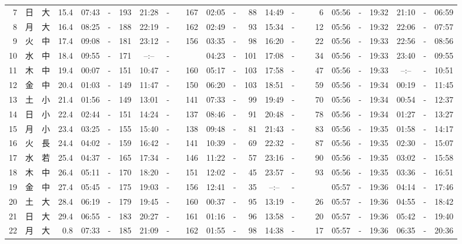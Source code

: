 \documentclass[12pt,a4j]{jsarticle}
\begin{document}
\begin{table}[htbp]
\begin{center}
{\begin{tabular}{|rc|cr|ccrccr|ccrccr|ccc|ccc|}
 7 & 日 & 大 & 15.4 &  07:43 &-& 193 &  21:28 &-& 167 &  02:05 &-&  88 &  14:49 &-&   6 & 05:56 & -& 19:32 & 21:10 & -& 06:59 \\
 8 & 月 & 大 & 16.4 &  08:25 &-& 188 &  22:19 &-& 162 &  02:49 &-&  93 &  15:34 &-&  12 & 05:56 & -& 19:32 & 22:06 & -& 07:57 \\
 9 & 火 & 中 & 17.4 &  09:08 &-& 181 &  23:12 &-& 156 &  03:35 &-&  98 &  16:20 &-&  22 & 05:56 & -& 19:33 & 22:56 & -& 08:56 \\
10 & 水 & 中 & 18.4 &  09:55 &-& 171 &  --:-- &-&~~~~~ &  04:23 &-& 101 &  17:08 &-&  34 & 05:56 & -& 19:33 & 23:40 & -& 09:55 \\
11 & 木 & 中 & 19.4 &  00:07 &-& 151 &  10:47 &-& 160 &  05:17 &-& 103 &  17:58 &-&  47 & 05:56 & -& 19:33 & --:-- & -& 10:51 \\
12 & 金 & 中 & 20.4 &  01:03 &-& 149 &  11:47 &-& 150 &  06:20 &-& 103 &  18:51 &-&  59 & 05:56 & -& 19:34 & 00:19 & -& 11:45 \\
13 & 土 & 小 & 21.4 &  01:56 &-& 149 &  13:01 &-& 141 &  07:33 &-&  99 &  19:49 &-&  70 & 05:56 & -& 19:34 & 00:54 & -& 12:37 \\
14 & 日 & 小 & 22.4 &  02:44 &-& 151 &  14:24 &-& 137 &  08:46 &-&  91 &  20:48 &-&  78 & 05:56 & -& 19:34 & 01:27 & -& 13:27 \\
15 & 月 & 小 & 23.4 &  03:25 &-& 155 &  15:40 &-& 138 &  09:48 &-&  81 &  21:43 &-&  83 & 05:56 & -& 19:35 & 01:58 & -& 14:17 \\
16 & 火 & 長 & 24.4 &  04:02 &-& 159 &  16:42 &-& 141 &  10:39 &-&  69 &  22:32 &-&  87 & 05:56 & -& 19:35 & 02:30 & -& 15:07 \\
17 & 水 & 若 & 25.4 &  04:37 &-& 165 &  17:34 &-& 146 &  11:22 &-&  57 &  23:16 &-&  90 & 05:56 & -& 19:35 & 03:02 & -& 15:58 \\
18 & 木 & 中 & 26.4 &  05:11 &-& 170 &  18:20 &-& 151 &  12:02 &-&  45 &  23:57 &-&  93 & 05:56 & -& 19:35 & 03:36 & -& 16:51 \\
19 & 金 & 中 & 27.4 &  05:45 &-& 175 &  19:03 &-& 156 &  12:41 &-&  35 &  --:-- &-&~~~~~ & 05:57 & -& 19:36 & 04:14 & -& 17:46 \\
20 & 土 & 大 & 28.4 &  06:19 &-& 179 &  19:45 &-& 160 &  00:37 &-&  95 &  13:19 &-&  26 & 05:57 & -& 19:36 & 04:55 & -& 18:42 \\
21 & 日 & 大 & 29.4 &  06:55 &-& 183 &  20:27 &-& 161 &  01:16 &-&  96 &  13:58 &-&  20 & 05:57 & -& 19:36 & 05:42 & -& 19:40 \\
22 & 月 & 大 &  0.8 &  07:33 &-& 185 &  21:09 &-& 162 &  01:55 &-&  98 &  14:38 &-&  17 & 05:57 & -& 19:36 & 06:35 & -& 20:36 \\

\end{tabular}}
\end{center}
\end{table}
\end{document}
